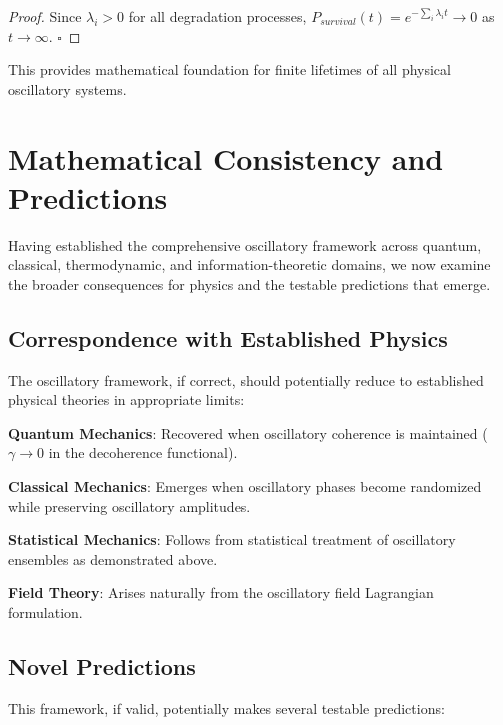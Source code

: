 \documentclass[11pt]{article}
\theoremstyle{remark}
\begin{document}
\begin{proof}
Since $\lambda_i > 0$ for all degradation processes, $P_{survival}(t) = e^{-\sum_i \lambda_i t} \to 0$ as $t \to \infty$. $\square$
\end{proof}

This provides mathematical foundation for finite lifetimes of all physical oscillatory systems.

\section{Mathematical Consistency and Predictions}

Having established the comprehensive oscillatory framework across quantum, classical, thermodynamic, and information-theoretic domains, we now examine the broader consequences for physics and the testable predictions that emerge.

\subsection{Correspondence with Established Physics}

The oscillatory framework, if correct, should potentially reduce to established physical theories in appropriate limits:

\textbf{Quantum Mechanics}: Recovered when oscillatory coherence is maintained ($\gamma \to 0$ in the decoherence functional).

\textbf{Classical Mechanics}: Emerges when oscillatory phases become randomized while preserving oscillatory amplitudes.

\textbf{Statistical Mechanics}: Follows from statistical treatment of oscillatory ensembles as demonstrated above.

\textbf{Field Theory}: Arises naturally from the oscillatory field Lagrangian formulation.

\subsection{Novel Predictions}

This framework, if valid, potentially makes several testable predictions:
\end{document}
